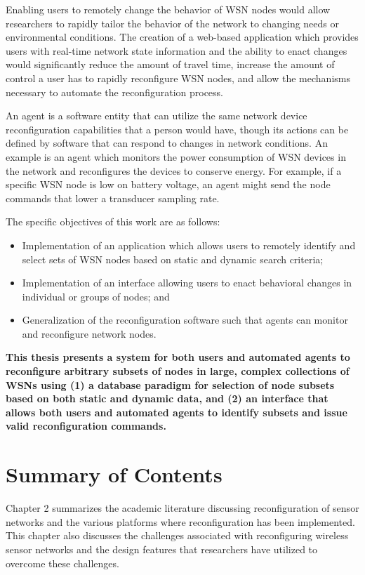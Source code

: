 Enabling users to remotely change the behavior of WSN nodes would allow researchers to rapidly tailor the behavior of the network to changing needs or environmental conditions. The creation of a web-based application which provides users with real-time network state information and the ability to enact changes would significantly reduce the amount of travel time, increase the amount of control a user has to rapidly reconfigure WSN nodes, and allow the mechanisms necessary to automate the reconfiguration process.

An agent is a software entity that can utilize the same network device reconfiguration capabilities that a person would have, though its actions can be defined by software that can respond to changes in network conditions. An example is an agent which monitors the power consumption of WSN devices in the network and reconfigures the devices to conserve energy. For example, if a specific WSN node is low on battery voltage, an agent might send the node commands that lower a transducer sampling rate.

The specific objectives of this work are as follows:

\begin{itemize}
	\item Implementation of an application which allows users to remotely identify and select sets of WSN nodes based on static and dynamic search criteria;
	\item Implementation of an interface allowing users to enact behavioral changes in individual or groups of nodes; and
	\item Generalization of the reconfiguration software such that agents can monitor and reconfigure network nodes.
\end{itemize}


\textbf{This thesis presents a system for both users and automated agents to reconfigure arbitrary subsets of nodes in large, complex collections of WSNs using (1) a database paradigm for selection of node subsets based on both static and dynamic data, and (2) an interface that allows both users and automated agents to identify subsets and issue valid reconfiguration commands.}

\section{Summary of Contents}


Chapter 2 summarizes the academic literature discussing reconfiguration of sensor networks and the various platforms where reconfiguration has been implemented. This chapter also discusses the challenges associated with reconfiguring wireless sensor networks and the design features that researchers have utilized to overcome these challenges.

